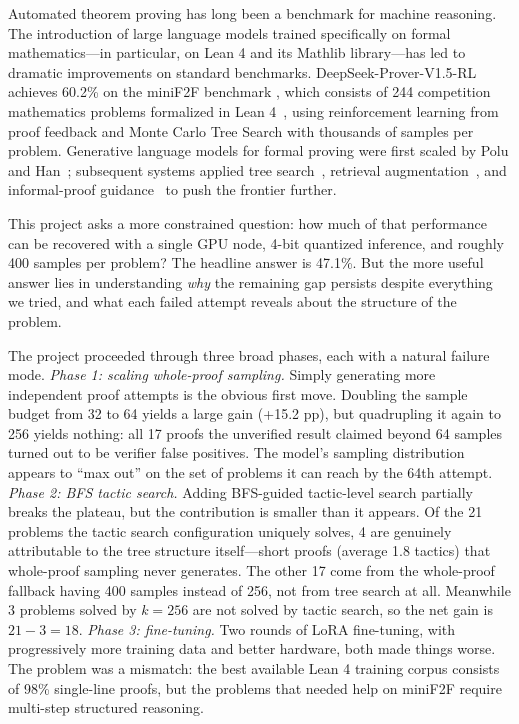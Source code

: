 \documentclass[openany, amssymb, psamsfonts]{amsart}
\theoremstyle{definition}
\numberwithin{equation}{section}
\begin{document}
Automated theorem proving has long been a benchmark for machine reasoning.
The introduction of large language models trained specifically on formal
mathematics---in particular, on Lean 4 and its Mathlib library---has led
to dramatic improvements on standard benchmarks.
DeepSeek-Prover-V1.5-RL \cite{deepseek} achieves 60.2\% on the miniF2F
benchmark \cite{minif2f}, which consists of 244 competition mathematics problems
formalized in Lean 4~\cite{lean4}, using reinforcement learning from proof feedback and
Monte Carlo Tree Search with thousands of samples per problem.
Generative language models for formal proving were first scaled by Polu and
Han~\cite{polu2020}; subsequent systems applied tree search~\cite{hypertree},
retrieval augmentation~\cite{leandojo}, and informal-proof
guidance~\cite{dsp} to push the frontier further.

This project asks a more constrained question: how much of that performance
can be recovered with a single GPU node, 4-bit quantized inference, and
roughly 400 samples per problem?
The headline answer is 47.1\%.
But the more useful answer lies in understanding \emph{why} the remaining
gap persists despite everything we tried, and what each failed attempt
reveals about the structure of the problem.

The project proceeded through three broad phases, each with a natural
failure mode.
\emph{Phase 1: scaling whole-proof sampling.}
Simply generating more independent proof attempts is the obvious first move.
Doubling the sample budget from 32 to 64 yields a large gain (+15.2 pp),
but quadrupling it again to 256 yields nothing: all 17 proofs the unverified
result claimed beyond 64 samples turned out to be verifier false positives.
The model's sampling distribution appears to ``max out'' on the set of problems
it can reach by the 64th attempt.
\emph{Phase 2: BFS tactic search.}
Adding BFS-guided tactic-level search partially breaks the plateau, but
the contribution is smaller than it appears.
Of the 21 problems the tactic search configuration uniquely solves, 4 are
genuinely attributable to the tree structure itself---short proofs
(average 1.8 tactics) that whole-proof sampling never generates.
The other 17 come from the whole-proof fallback having 400 samples
instead of 256, not from tree search at all.
Meanwhile 3 problems solved by $k=256$ are not solved by tactic search,
so the net gain is $21 - 3 = 18$.
\emph{Phase 3: fine-tuning.}
Two rounds of LoRA fine-tuning, with progressively more training data and
better hardware, both made things worse.
The problem was a mismatch: the best available Lean 4 training corpus
consists of 98\% single-line proofs, but the problems that needed help on
miniF2F require multi-step structured reasoning.
\end{document}
